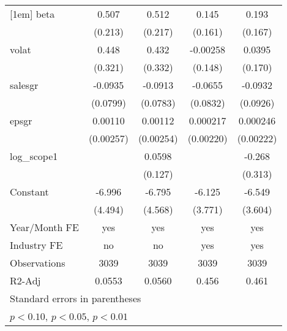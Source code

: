 {\begin{tabular}{l*{4}{c}}
[1em]
beta                &       0.507\sym{**} &       0.512\sym{**} &       0.145         &       0.193         \\
                    &     (0.213)         &     (0.217)         &     (0.161)         &     (0.167)         \\
[1em]
volat               &       0.448         &       0.432         &    -0.00258         &      0.0395         \\
                    &     (0.321)         &     (0.332)         &     (0.148)         &     (0.170)         \\
[1em]
salesgr             &     -0.0935         &     -0.0913         &     -0.0655         &     -0.0932         \\
                    &    (0.0799)         &    (0.0783)         &    (0.0832)         &    (0.0926)         \\
[1em]
epsgr               &     0.00110         &     0.00112         &    0.000217         &    0.000246         \\
                    &   (0.00257)         &   (0.00254)         &   (0.00220)         &   (0.00222)         \\
[1em]
log\_scope1          &                     &      0.0598         &                     &      -0.268         \\
                    &                     &     (0.127)         &                     &     (0.313)         \\
[1em]
Constant            &      -6.996         &      -6.795         &      -6.125         &      -6.549\sym{*}  \\
                    &     (4.494)         &     (4.568)         &     (3.771)         &     (3.604)         \\
\hline
Year/Month FE       &         yes         &         yes         &         yes         &         yes         \\
Industry FE         &          no         &          no         &         yes         &         yes         \\
Observations        &        3039         &        3039         &        3039         &        3039         \\
R2-Adj              &      0.0553         &      0.0560         &       0.456         &       0.461         \\
\hline\hline
\multicolumn{5}{l}{\footnotesize Standard errors in parentheses}\\
\multicolumn{5}{l}{\footnotesize \sym{*} \(p<0.10\), \sym{**} \(p<0.05\), \sym{***} \(p<0.01\)}\\
\end{tabular}
}
